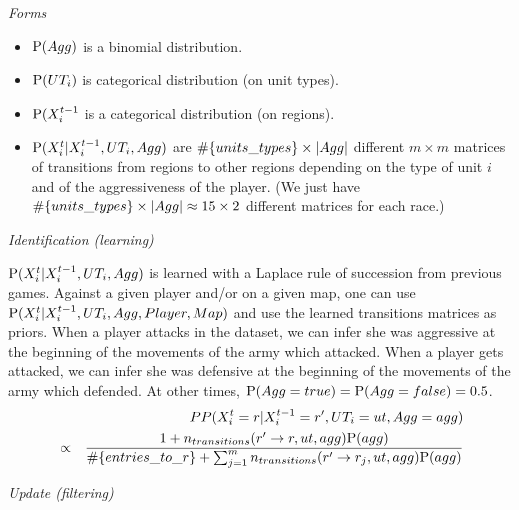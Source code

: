 \vspace{0.3cm}
\textit{Forms}\\
\vspace{0.5cm}

\begin{itemize}
    \item $\mathrm{P}(Agg)$ is a binomial distribution.
    \item $\mathrm{P}(UT_i)$ is categorical distribution (on unit types).
    \item $\mathrm{P}(X^{t-1}_{i}$ is a categorical distribution (on regions).
    \item $\mathrm{P}(X^t_i|X^{t-1}_i,UT_i,Agg)$ are $\#\{units\_types\} \times \left\lvert Agg\right\rvert$ different $m\times m$ matrices of transitions from regions to other regions depending on the type of unit $i$ and of the aggressiveness of the player. (We just have $\#\{units\_types\} \times \left\lvert Agg\right\rvert \approx 15\times 2$ different matrices for each race.)
\end{itemize}


\vspace{0.3cm}
\textit{Identification (learning)}\\
\vspace{0.5cm}

$\mathrm{P}(X^t_i|X^{t-1}_i, UT_i, Agg)$ is learned with a Laplace rule of succession from previous games. Against a given player and/or on a given map, one can use $\mathrm{P}(X^t_i|X^{t-1}_i, UT_i, Agg, Player, Map)$ and use the learned transitions matrices as priors. When a player attacks in the dataset, we can infer she was aggressive at the beginning of the movements of the army which attacked. When a player gets attacked, we can infer she was defensive at the beginning of the movements of the army which defended. At other times, $\mathrm{P}(Agg=true) = \mathrm{P}(Agg=false) = 0.5$.
\begin{eqnarray*}
& & PP(X^t_i=r|X^{t-1}_i=r', UT_i=ut, Agg=agg) \\
& \propto & \frac{1+n_{transitions}(r'\rightarrow r, ut, agg)\mathrm{P}(agg)}{\#\{entries\_to\_r\} + \sum_{j=1}^{m} n_{transitions}(r' \rightarrow r_j, ut, agg)\mathrm{P}(agg)}
\end{eqnarray*}

\vspace{0.3cm}
\textit{Update (filtering)}\\
\vspace{0.5cm}

